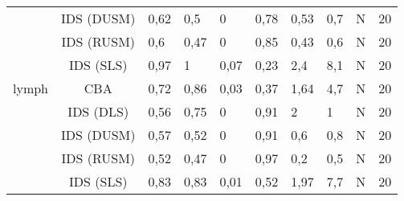 \begin{tabular}{ccllllllll}
      & IDS (DUSM) &               0,62 &                             0,5 &                               0 &                              0,78 &                              0,53 &                           0,7 &                            N &                         20 \\
      & IDS (RUSM) &                0,6 &                            0,47 &                               0 &                              0,85 &                              0,43 &                           0,6 &                            N &                         20 \\
      & IDS (SLS) &               0,97 &                               1 &                            0,07 &                              0,23 &                               2,4 &                           8,1 &                            N &                         20 \\
lymph & CBA &               0,72 &                            0,86 &                            0,03 &                              0,37 &                              1,64 &                           4,7 &                            N &                         20 \\
      & IDS (DLS) &               0,56 &                            0,75 &                               0 &                              0,91 &                                 2 &                             1 &                            N &                         20 \\
      & IDS (DUSM) &               0,57 &                            0,52 &                               0 &                              0,91 &                               0,6 &                           0,8 &                            N &                         20 \\
      & IDS (RUSM) &               0,52 &                            0,47 &                               0 &                              0,97 &                               0,2 &                           0,5 &                            N &                         20 \\
      & IDS (SLS) &               0,83 &                            0,83 &                            0,01 &                              0,52 &                              1,97 &                           7,7 &                            N &                         20 \\
\bottomrule
\end{tabular}
